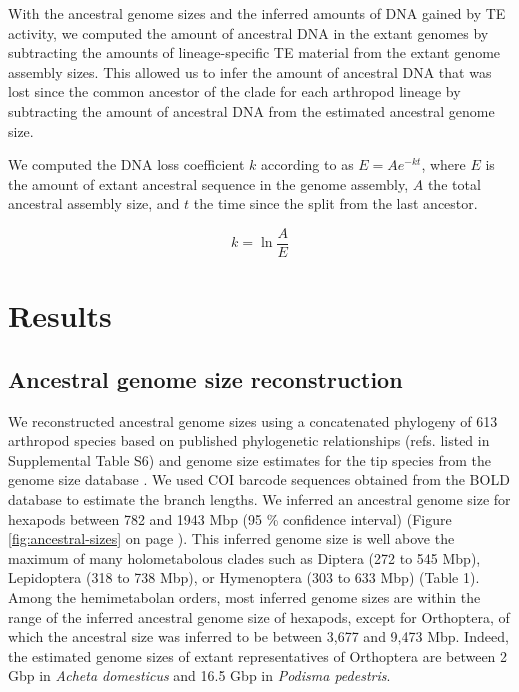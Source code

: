 With the ancestral genome sizes and the inferred amounts of DNA gained
by TE activity, we computed the amount of ancestral DNA in the extant
genomes by subtracting the amounts of lineage-specific TE material from
the extant genome assembly sizes. This allowed us to infer the amount of
ancestral DNA that was lost since the common ancestor of the clade for
each arthropod lineage by subtracting the amount of ancestral DNA from
the estimated ancestral genome size.

We computed the DNA loss coefficient $k$ according to
\citet{Lindblad-Toh2005} as $E = A e^{-kt}$, where $E$ is
the amount of extant ancestral sequence in the genome assembly,
$A$ the total ancestral assembly size, and
$t$ the time since the split from the last ancestor.

\begin{equation}
k = \ln{\frac{A}{E}}
\end{equation}

\section{Results}

\subsection{Ancestral genome size
reconstruction}

We reconstructed ancestral genome sizes using a concatenated phylogeny
of 613 arthropod species based on published phylogenetic relationships
(refs. listed in Supplemental Table S6) and genome size estimates for
the tip species from the genome size database \citep{Gregory2018}. We
used COI barcode sequences obtained from the BOLD database
\citep{Ratnasingham2007} to estimate the branch lengths. We inferred an
ancestral genome size for hexapods between 782 and 1943 Mbp (95 \%
confidence interval) (Figure \ref{fig:ancestral-sizes} on page
\pageref{fig:ancestral-sizes}). This inferred genome size is well above
the maximum of many holometabolous clades such as Diptera (272 to 545
Mbp), Lepidoptera (318 to 738 Mbp), or Hymenoptera (303 to 633 Mbp)
(Table 1). Among the hemimetabolan orders, most inferred genome sizes
are within the range of the inferred ancestral genome size of hexapods,
except for Orthoptera, of which the ancestral size was inferred to be
between 3,677 and 9,473 Mbp. Indeed, the estimated genome sizes of
extant representatives of Orthoptera are between 2 Gbp in \emph{Acheta
domesticus} and 16.5 Gbp in \emph{Podisma pedestris}.

